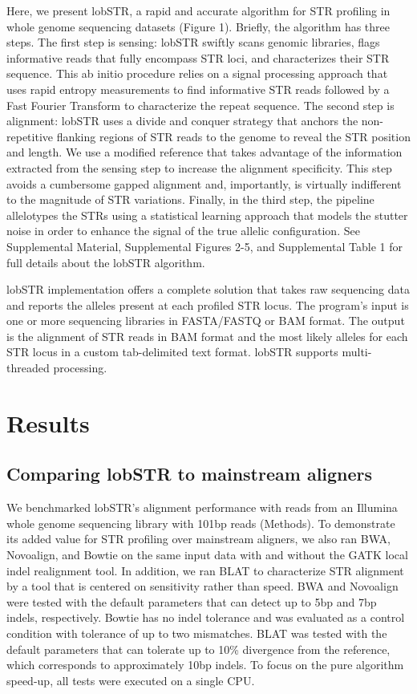 Here, we present lobSTR, a rapid and accurate algorithm for STR profiling in whole genome sequencing datasets (Figure 1). Briefly, the algorithm has three steps. The first step is sensing: lobSTR swiftly scans genomic libraries, flags informative reads that fully encompass STR loci, and characterizes their STR sequence. This ab initio procedure relies on a signal processing approach that uses rapid entropy measurements to find informative STR reads followed by a Fast Fourier Transform to characterize the repeat sequence. The second step is alignment: lobSTR uses a divide and conquer strategy that anchors the non-repetitive flanking regions of STR reads to the genome to reveal the STR position and length. We use a modified reference that takes advantage of the information extracted from the sensing step to increase the alignment specificity. This step avoids a cumbersome gapped alignment and, importantly, is virtually indifferent to the magnitude of STR variations. Finally, in the third step, the pipeline allelotypes the STRs using a statistical learning approach that models the stutter noise in order to enhance the signal of the true allelic configuration. See Supplemental Material, Supplemental Figures 2-5, and Supplemental Table 1 for full details about the lobSTR algorithm.

lobSTR implementation offers a complete solution that takes raw sequencing data and reports the alleles present at each profiled STR locus. The program’s input is one or more sequencing libraries in FASTA/FASTQ or BAM format. The output is the alignment of STR reads in BAM format and the most likely alleles for each STR locus in a custom tab-delimited text format. lobSTR supports multi-threaded processing.

\section{Results}
\subsection{Comparing lobSTR to mainstream aligners}

We benchmarked lobSTR’s alignment performance with reads from an Illumina whole genome sequencing library with 101bp reads (Methods). To demonstrate its added value for STR profiling over mainstream aligners, we also ran BWA, Novoalign, and Bowtie on the same input data with and without the GATK local indel realignment tool. In addition, we ran BLAT \cite{Kent2002} to characterize STR alignment by a tool that is centered on sensitivity rather than speed. BWA and Novoalign were tested with the default parameters that can detect up to 5bp and 7bp indels, respectively. Bowtie has no indel tolerance and was evaluated as a control condition with tolerance of up to two mismatches. BLAT was tested with the default parameters that can tolerate up to 10\% divergence from the reference, which corresponds to approximately 10bp indels. To focus on the pure algorithm speed-up, all tests were executed on a single CPU.

